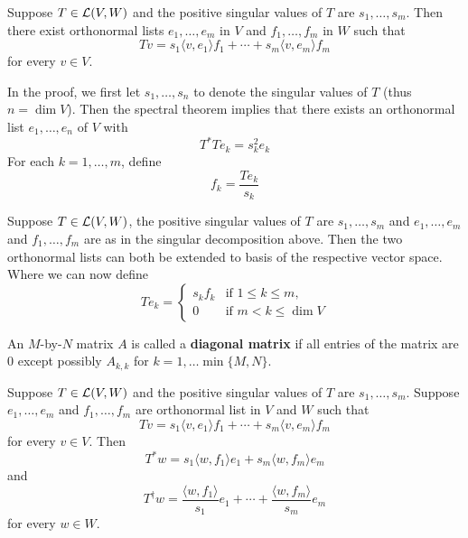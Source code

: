 \documentclass{extarticle}
\begin{document}
\begin{thm}[\textcolor{red}{SINGULAR VALUE DECOMPOSITION}]
    Suppose \(T \in \mathcal{L}(V, W)\) and the positive singular values of \(T\) are \(s_1, \ldots, s_m\). 
    Then there exist orthonormal lists \(e_1, \ldots, e_m\) in \(V\) and \(f_1, \ldots, f_m\) in \(W\)
    such that 
    \[Tv = s_1 \langle v,e_1 \rangle f_1 + \cdots + s_m \langle v,e_m \rangle f_m\]
    for every \(v \in V\).
\end{thm}

\begin{remark}
    In the proof, we first let \(s_1, \ldots, s_n\) to denote the singular values of \(T\) (thus 
    \(n = \dim V\)). Then the spectral theorem implies that there exists an orthonormal list \(e_1, \ldots, e_n\)
    of \(V\) with 
    \[T^* T e_k = s_k^2 e_k\]
    For each \(k = 1, \ldots, m\), define 
    \[f_k = \frac{T e_k}{s_k}\]
\end{remark}

\begin{remark}
    Suppose \(T \in \mathcal{L}(V, W)\), the positive singular values of \(T\) are \(s_1, \ldots, s_m\) 
    and \(e_1, \ldots, e_m\) and \(f_1, \ldots, f_m\) are as in the singular decomposition above. 
    Then the two orthonormal lists can both be extended to basis of the respective vector space.  Where 
    we can now define 
    \[Te_k = \begin{cases}
        s_k f_k &\text{if } 1 \leq k \leq m, \\ 
        0 &\text{if } m < k \leq \dim V
    \end{cases}\]
\end{remark}

\begin{definition}
    An \(M\)-by-\(N\) matrix \(A\) is called a \textbf{diagonal matrix} if all entries of the matrix are 0 
    except possibly \(A_{k, k}\) for \(k = 1, \ldots \min \{M, N\}\).
\end{definition}

\begin{thm}
    Suppose \(T \in \mathcal{L}(V, W)\) and the positive singular values of \(T\) are 
    \(s_1, \ldots, s_m\). Suppose \(e_1, \ldots, e_m\) and \(f_1, \ldots, f_m\) are orthonormal 
    list in \(V\) and \(W\) such that 
    \[Tv = s_1 \langle v,e_1 \rangle f_1 + \cdots + s_m \langle v,e_m \rangle f_m\]
    for every \(v \in V\). Then 
    \[T^*w = s_1 \langle w,f_1 \rangle e_1 + s_m \langle w,f_m \rangle e_m\]
    and 
    \[T^\dagger w = \frac{\langle w,f_1 \rangle}{s_1}e_1 + \cdots + \frac{\langle w,f_m \rangle}{s_m}e_m\]
    for every \(w \in W\).
\end{thm}
\end{document}
